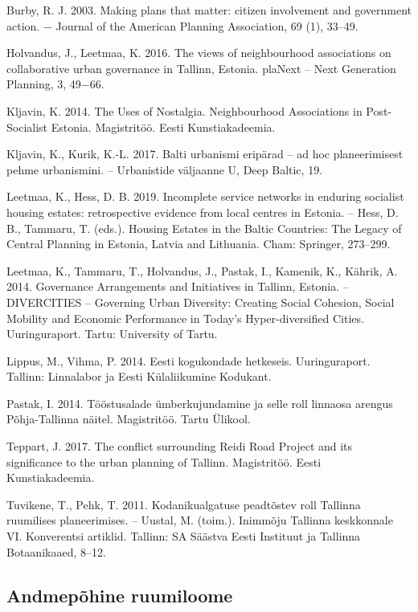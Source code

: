 \documentclass[estonian,]{article}
\begin{document}
Burby, R. J. 2003. Making plans that matter: citizen involvement and government action. − Journal of the American Planning Association, 69 (1), 33--49.

Holvandus, J., Leetmaa, K. 2016. The views of neighbourhood associations on collaborative urban governance in Tallinn, Estonia. plaNext -- Next Generation Planning, 3, 49−66.

Kljavin, K. 2014. The Uses of Nostalgia. Neighbourhood Associations in Post-Socialist Estonia. Magistritöö. Eesti Kunstiakadeemia.

Kljavin, K., Kurik, K.-L. 2017. Balti urbanismi eripärad -- ad hoc planeerimisest pehme urbanismini. -- Urbanistide väljaanne U, Deep Baltic, 19.

Leetmaa, K., Hess, D. B. 2019. Incomplete service networks in enduring socialist housing estates: retrospective evidence from local centres in Estonia. -- Hess, D. B., Tammaru, T. (eds.). Housing Estates in the Baltic Countries: The Legacy of Central Planning in Estonia, Latvia and Lithuania. Cham: Springer, 273--299.

Leetmaa, K., Tammaru, T., Holvandus, J., Pastak, I., Kamenik, K., Kährik, A. 2014. Governance Arrangements and Initiatives in Tallinn, Estonia. -- DIVERCITIES -- Governing Urban Diversity: Creating Social Cohesion, Social Mobility and Economic Performance in Today's Hyper-diversified Cities. Uuringuraport. Tartu: University of Tartu.

Lippus, M., Vihma, P. 2014. Eesti kogukondade hetkeseis. Uuringuraport. Tallinn: Linnalabor ja Eesti Külaliikumine Kodukant.

Pastak, I. 2014. Tööstusalade ümberkujundamine ja selle roll linnaosa arengus Põhja-Tallinna näitel. Magistritöö. Tartu Ülikool.

Teppart, J. 2017. The conflict surrounding Reidi Road Project and its significance to the urban planning of Tallinn. Magistritöö. Eesti Kunstiakadeemia.

Tuvikene, T., Pehk, T. 2011. Kodanikualgatuse peadtõstev roll Tallinna ruumilises planeerimises. -- Uustal, M. (toim.). Inimmõju Tallinna keskkonnale VI. Konverentsi artiklid. Tallinn: SA Säästva Eesti Instituut ja Tallinna Botaanikaaed, 8--12.

\hypertarget{andmepuxf5hine-ruumiloome}{%
\subsection{Andmepõhine ruumiloome}\label{andmepuxf5hine-ruumiloome}}
\end{document}
